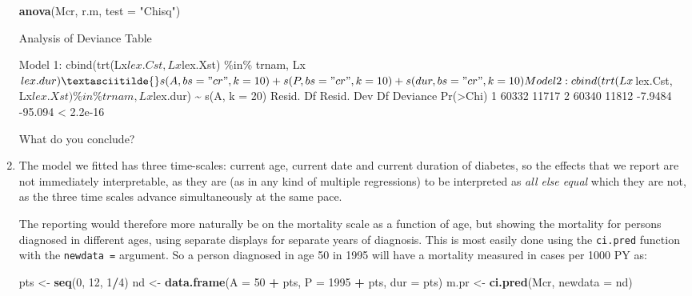 \documentclass[
]{book}
\newenvironment{Shaded}{\begin{snugshade}}{\end{snugshade}}
\newcommand{\AttributeTok}[1]{\textcolor[rgb]{0.13,0.29,0.53}{#1}}
\newcommand{\DecValTok}[1]{\textcolor[rgb]{0.00,0.00,0.81}{#1}}
\newcommand{\FunctionTok}[1]{\textcolor[rgb]{0.13,0.29,0.53}{\textbf{#1}}}
\newcommand{\NormalTok}[1]{#1}
\newcommand{\OtherTok}[1]{\textcolor[rgb]{0.56,0.35,0.01}{#1}}
\newcommand{\SpecialCharTok}[1]{\textcolor[rgb]{0.81,0.36,0.00}{\textbf{#1}}}
\newcommand{\StringTok}[1]{\textcolor[rgb]{0.31,0.60,0.02}{#1}}
\begin{document}
\begin{enumerate}
\begin{Shaded}
\begin{Highlighting}[]
\FunctionTok{anova}\NormalTok{(Mcr, r.m, }\AttributeTok{test =} \StringTok{"Chisq"}\NormalTok{)}
\end{Highlighting}
\end{Shaded}

\begin{Shaded}
\begin{Highlighting}[]
\NormalTok{Analysis of Deviance Table}

\NormalTok{Model 1: cbind(trt(Lx$lex.Cst, Lx$lex.Xst) \%in\% trnam, Lx$lex.dur) \textasciitilde{} s(A, }
\NormalTok{    bs = "cr", k = 10) + s(P, bs = "cr", k = 10) + s(dur, bs = "cr", }
\NormalTok{    k = 10)}
\NormalTok{Model 2: cbind(trt(Lx$lex.Cst, Lx$lex.Xst) \%in\% trnam, Lx$lex.dur) \textasciitilde{} s(A, }
\NormalTok{    k = 20)}
\NormalTok{  Resid. Df Resid. Dev      Df Deviance  Pr(\textgreater{}Chi)}
\NormalTok{1     60332      11717                           }
\NormalTok{2     60340      11812 {-}7.9484  {-}95.094 \textless{} 2.2e{-}16}
\end{Highlighting}
\end{Shaded}

  What do you conclude?
\item
  The model we fitted has three time-scales: current age, current
  date and current duration of diabetes, so the effects that we report
  are not immediately interpretable, as they are (as in any kind of
  multiple regressions) to be interpreted as \emph{all else equal} which
  they are not, as the three time scales advance simultaneously at the
  same pace.

  The reporting would therefore more naturally be on the
  mortality scale as a function of age, but showing the mortality
  for persons diagnosed in different ages, using separate displays
  for separate years of diagnosis.
  This is most easily done using the \texttt{ci.pred} function with
  the \texttt{newdata\ =} argument. So a person diagnosed in age 50 in
  1995 will have a mortality measured in cases per 1000 PY as:

\begin{Shaded}
\begin{Highlighting}[]
\NormalTok{pts }\OtherTok{\textless{}{-}} \FunctionTok{seq}\NormalTok{(}\DecValTok{0}\NormalTok{, }\DecValTok{12}\NormalTok{, }\DecValTok{1}\SpecialCharTok{/}\DecValTok{4}\NormalTok{)}
\NormalTok{nd }\OtherTok{\textless{}{-}} \FunctionTok{data.frame}\NormalTok{(}\AttributeTok{A =} \DecValTok{50}   \SpecialCharTok{+}\NormalTok{ pts, }
                 \AttributeTok{P =} \DecValTok{1995} \SpecialCharTok{+}\NormalTok{ pts, }
               \AttributeTok{dur =}\NormalTok{        pts)}
\NormalTok{m.pr }\OtherTok{\textless{}{-}} \FunctionTok{ci.pred}\NormalTok{(Mcr, }\AttributeTok{newdata =}\NormalTok{ nd)}
\end{Highlighting}
\end{Shaded}


\end{enumerate}
\end{document}
